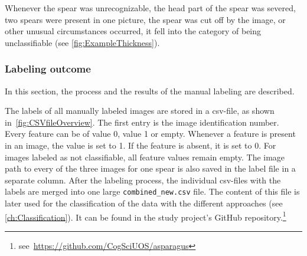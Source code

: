 Whenever the spear was unrecognizable, the head part of the spear was severed, two spears were present in one picture, the spear was cut off by the image, or other unusual circumstances occurred, it fell into the category of being unclassifiable (see \autoref{fig:ExampleThickness}).


\subsubsection{Labeling outcome}
\label{subsec:SortingOutcome}

In this section, the process and the results of the manual labeling are described.

The labels of all manually labeled images are stored in a csv-file, as shown in~\autoref{fig:CSVfileOverview}. The first entry is the image identification number. Every feature can be of value 0, value 1 or empty. Whenever a feature is present in an image, the value is set to 1. If the feature is absent, it is set to 0. For images labeled as not classifiable, all feature values remain empty. The image path to every of the three images for one spear is also saved in the label file in a separate column. After the labeling process, the individual csv-files with the labels are merged into one large \texttt{combined\_new.csv} file. The content of this file is later used for the classification of the data with the different approaches (see \autoref{ch:Classification}). It can be found in the study project’s GitHub repository.\footnote{see~\url{https://github.com/CogSciUOS/asparagus}}

\begin{table}[!hb]
	\centering
	\vspace{10pt}
	\caption[Manual Labeling Feature Representation]{\textbf{Feature Representation in the Data Set} \\ In this table, the representation of each feature in the manually labeled 13319 asparagus samples is reported in \%.}
	\label{tab:FeatureRepresentation}
\end{table}

